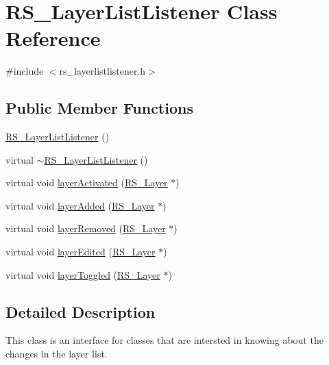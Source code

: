 \hypertarget{class_r_s___layer_list_listener}{\section{R\-S\-\_\-\-Layer\-List\-Listener Class Reference}
\label{class_r_s___layer_list_listener}
}


{\ttfamily \#include $<$rs\-\_\-layerlistlistener.\-h$>$}

\subsection*{Public Member Functions}
\begin{DoxyCompactItemize}
\item 
\hyperlink{class_r_s___layer_list_listener_ad1a6efc1c706ce0e9a06c10826c19438}{R\-S\-\_\-\-Layer\-List\-Listener} ()
\item 
virtual \hyperlink{class_r_s___layer_list_listener_a285575eb226ac3062e342de32010ebbc}{$\sim$\-R\-S\-\_\-\-Layer\-List\-Listener} ()
\item 
virtual void \hyperlink{class_r_s___layer_list_listener_a09ebd52346c417fe0e82876cc0abc59e}{layer\-Activated} (\hyperlink{class_r_s___layer}{R\-S\-\_\-\-Layer} $\ast$)
\item 
virtual void \hyperlink{class_r_s___layer_list_listener_a0dcaa002205a13589a576eebc1723153}{layer\-Added} (\hyperlink{class_r_s___layer}{R\-S\-\_\-\-Layer} $\ast$)
\item 
virtual void \hyperlink{class_r_s___layer_list_listener_a1135bfb08284866a5ea1190213b3e761}{layer\-Removed} (\hyperlink{class_r_s___layer}{R\-S\-\_\-\-Layer} $\ast$)
\item 
virtual void \hyperlink{class_r_s___layer_list_listener_a6953aab6245c88b0bed2f25493522791}{layer\-Edited} (\hyperlink{class_r_s___layer}{R\-S\-\_\-\-Layer} $\ast$)
\item 
virtual void \hyperlink{class_r_s___layer_list_listener_a159ef2488a66a30c08b050e277083c25}{layer\-Toggled} (\hyperlink{class_r_s___layer}{R\-S\-\_\-\-Layer} $\ast$)
\end{DoxyCompactItemize}


\subsection{Detailed Description}
This class is an interface for classes that are intersted in knowing about the changes in the layer list. 

